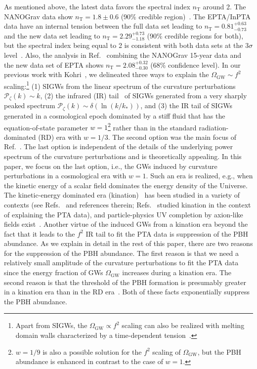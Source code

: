 \documentclass[superscriptaddress, aps, preprintnumbers,
amsmath, amssymb, sort&compress, nofootinbib, 10pt, paper, floatfix]{revtex4-2}
\newcommand{\GW}{\text{GW}}
\begin{document}
As mentioned above, the latest data favors the spectral index $n_\text{T}$ around 2. The NANOGrav data show $n_\text{T} = 1.8 \pm 0.6$ (90\% credible region)~\cite{NANOGrav:2023gor}. The EPTA/InPTA data have an internal tension between the full data set leading to $n_\text{T}  = 0.81 ^{+0.63}_{-0.73}$ and the new data set leading to $n_\text{T} = 2.29 ^{+0.73}_{-1.18}$ (90\% credible regions for both), but the spectral index being equal to 2 is consistent with both data sets at the 3$\sigma$ level~\cite{Antoniadis:2023rey}. Also, the analysis in Ref.~\cite{Figueroa:2023zhu} combining the NANOGrav 15-year data and the new data set of EPTA shows $n_\text{T} = 2.08^{+0.32}_{-0.30}$ (68\% confidence level). In our previous work with Kohri~\cite{Inomata:2023zup}, we delineated three ways to explain the  $\Omega_\text{GW} \sim f^2$ scaling:\footnote{Apart from SIGWs, the $\Omega_\GW \propto f^2$ scaling can also be realized with melting domain walls characterized by a time-dependent tension~\cite{Babichev:2023pbf}.} (1) SIGWs from the linear spectrum of the curvature perturbations $\mathcal{P}_\zeta (k) \sim k$, (2) the infrared (IR) tail~\cite{Cai:2019cdl, Yuan:2019wwo, Domenech:2020kqm} of SIGWs generated from a very sharply peaked spectrum $\mathcal{P}_\zeta (k) \sim \delta (\ln (k/k_*))$, and (3) the IR tail of SIGWs generated in a cosmological epoch dominated by a stiff fluid that has the equation-of-state parameter $w=1$\footnote{
$w=1/9$ is also a possible solution for the $f^2$ scaling of $\Omega_\GW$, but the PBH abundance is enhanced in contrast to the case of $w = 1$.
} rather than in the standard radiation-dominated (RD) era with $w=1/3$.
The second option was the main focus of Ref.~\cite{Inomata:2023zup}.
The last option is independent of the details of the underlying power spectrum of the curvature perturbations and is theoretically appealing. 
In this paper, we focus on the last option, i.e., the GWs induced by curvature perturbations in a cosmological era with $w = 1$. Such an era is realized, e.g., when the kinetic energy of a scalar field dominates the energy density of the Universe.  The kinetic-energy dominated era (kination)~\cite{Spokoiny:1993kt, Joyce:1996cp, Ferreira:1997hj} has been studied in a variety of contexts (see Refs.~\cite{Co:2021lkc, Gouttenoire:2021jhk} and references therein; Refs.~\cite{Haque:2021dha,Chowdhury:2023opo,Ben-Dayan:2023lwd} studied kination in the context of explaining the PTA data), and particle-physics UV completion by axion-like fields exist~\cite{Co:2019wyp}.  Another virtue of the induced GWs from a kination era beyond the fact that it leads to the $f^2$ IR tail to fit the PTA data is suppression of the PBH abundance.  As we explain in detail in the rest of this paper, there are two reasons for the suppression of the PBH abundance. The first reason is that we need a relatively small amplitude of the curvature perturbations to fit the PTA data since the energy fraction of GWs $\Omega_\text{GW}$ increases during a kination era. The second reason is that the threshold of the PBH formation is presumably greater in a kination era than in the RD era~\cite{Carr:1975qj, Musco:2012au, Harada:2013epa, Escriva:2020tak}.  Both of these facts exponentially suppress the PBH abundance.  
\end{document}
